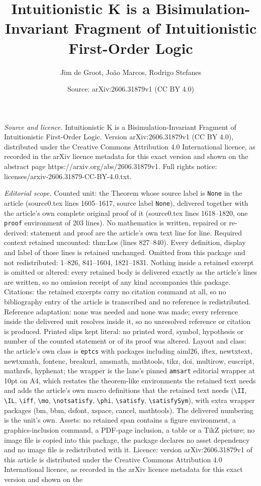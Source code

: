 \documentclass[10pt,a4paper]{amsart}
\title[Intuitionistic K is a Bisimulation-Invariant Fragment of Int]{Intuitionistic K is a Bisimulation-Invariant Fragment of Intuitionistic First-Order Logic}
\author{Jim de Groot, Jo\~ao Marcos, Rodrigo Stefanes}
\date{Source: arXiv:2606.31879v1 (CC BY 4.0)}
\begin{document}
\maketitle

\noindent\emph{Source and licence.} Intuitionistic K is a Bisimulation-Invariant Fragment of Intuitionistic First-Order Logic. Version arXiv:2606.31879v1 (CC BY 4.0), distributed under the Creative Commons Attribution 4.0 International licence, as recorded in the arXiv licence metadata for this exact version and shown on the abstract page https://arxiv.org/abs/2606.31879v1. Full rights notice: licenses/arxiv-2606.31879-CC-BY-4.0.txt.\par\smallskip

\noindent\textit{Editorial scope.} Counted unit: the Theorem whose source label is \texttt{None} in the article (source0.tex lines 1605--1617, source label \texttt{None}), delivered together with the article's own complete original proof of it (source0.tex lines 1618--1820, one \texttt{proof} environment of 203 lines). No mathematics is written, repaired or re-derived: statement and proof are the article's own text line for line. Required context retained uncounted: thm:Los (lines 827--840). Every definition, display and label of those lines is retained unchanged. Omitted from this package and not redistributed: 1--826, 841--1604, 1821--1831. Nothing inside a retained excerpt is omitted or altered: every retained body is delivered exactly as the article's lines are written, so no omission receipt of any kind accompanies this package. Citations: the retained excerpts carry no citation command at all, so no bibliography entry of the article is transcribed and no reference is redistributed. Reference adaptation: none was needed and none was made; every reference inside the delivered unit resolves inside it, so no unresolved reference or citation is produced. Printed slips kept literal: no printed word, symbol, hypothesis or number of the counted statement or of its proof was altered. Layout and class: the article's own class is \texttt{eptcs} with packages including aiml26, iftex, newtxtext, newtxmath, fontenc, breakurl, amsmath, mathtools, tikz, doi, multirow, euscript, mathrsfs, hyphenat; the wrapper is the lane's pinned \texttt{amsart} editorial wrapper at 10pt on A4, which restates the theorem-like environments the retained text needs and adds the article's own macro definitions that the retained text needs (\texttt{\textbackslash II}, \texttt{\textbackslash IL}, \texttt{\textbackslash iff}, \texttt{\textbackslash mo}, \texttt{\textbackslash notsatisfy}, \texttt{\textbackslash phi}, \texttt{\textbackslash satisfy}, \texttt{\textbackslash satisfySym}), with extra wrapper packages (bm, bbm, dsfont, xspace, cancel, mathtools). The delivered numbering is the unit's own. Assets: no retained span contains a figure environment, a graphics-inclusion command, a PDF-page inclusion, a table or a TikZ picture; no image file is copied into this package, the package declares no asset dependency and no image file is redistributed with it. Licence: version arXiv:2606.31879v1 of this article is distributed under the Creative Commons Attribution 4.0 International licence, as recorded in the arXiv licence metadata for this exact version and shown on the 
\end{document}
